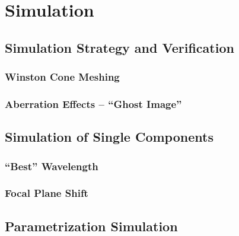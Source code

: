 \chapter{\iceact Simulation}\label{chap:iceact_sim}

\section{Simulation Strategy and Verification}

\subsection{Winston Cone Meshing}\label{sec:wico_meshing}

\subsection{Aberration Effects -- \enquote{Ghost Image}}\label{sec:ghost_image}

\section{Simulation of Single Components}

\subsection{\enquote{Best} Wavelength}

\subsection{Focal Plane Shift}

\section{Parametrization Simulation}